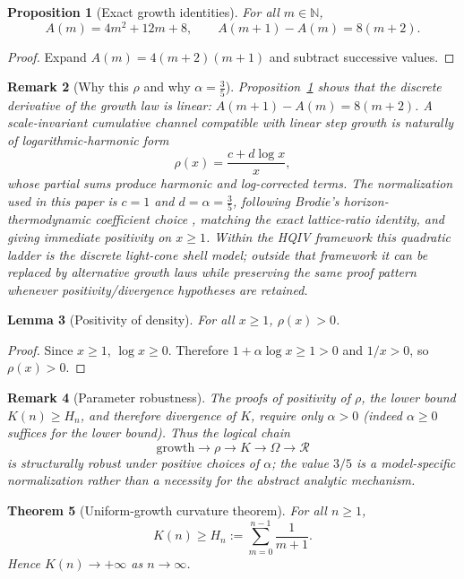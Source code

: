 \documentclass[11pt]{amsart}
\newtheorem{theorem}{Theorem}[section]
\newtheorem{lemma}[theorem]{Lemma}
\newtheorem{proposition}[theorem]{Proposition}
\newtheorem{remark}[theorem]{Remark}
\begin{document}
\begin{proposition}[Exact growth identities]
\label{prop:growth-identities}
For all $m\in\mathbb N$,
\[
A(m)=4m^2+12m+8,\qquad A(m+1)-A(m)=8(m+2).
\]
\end{proposition}

\begin{proof}
Expand $A(m)=4(m+2)(m+1)$ and subtract successive values.
\end{proof}

\begin{remark}[Why this $\rho$ and why $\alpha=\frac35$]
\label{rem:rho-motivation}
Proposition~\ref{prop:growth-identities} shows that the discrete derivative of the growth law is linear:
$A(m+1)-A(m)=8(m+2)$. A scale-invariant cumulative channel compatible with linear step growth is naturally of logarithmic-harmonic form
\[
\rho(x)=\frac{c+d\log x}{x},
\]
whose partial sums produce harmonic and log-corrected terms. The normalization used in this paper is $c=1$ and $d=\alpha=\frac35$, following Brodie's horizon-thermodynamic coefficient choice \cite{brodie2026}, matching the exact lattice-ratio identity, and giving immediate positivity on $x\ge 1$.
Within the HQIV framework this quadratic ladder is the discrete light-cone shell model; outside that framework it can be replaced by alternative growth laws while preserving the same proof pattern whenever positivity/divergence hypotheses are retained.
\end{remark}

\begin{lemma}[Positivity of density]
For all $x\ge 1$, $\rho(x)>0$.
\end{lemma}

\begin{proof}
Since $x\ge 1$, $\log x\ge 0$. Therefore $1+\alpha\log x\ge 1>0$ and $1/x>0$, so $\rho(x)>0$.
\end{proof}

\begin{remark}[Parameter robustness]
The proofs of positivity of \(\rho\), the lower bound \(K(n)\ge H_n\), and therefore divergence of \(K\), require only \(\alpha>0\) (indeed \(\alpha\ge 0\) suffices for the lower bound). Thus the logical chain
\[
\text{growth}\to \rho \to K \to \Omega \to \mathcal R
\]
is structurally robust under positive choices of \(\alpha\); the value \(3/5\) is a model-specific normalization rather than a necessity for the abstract analytic mechanism.
\end{remark}

\begin{theorem}[Uniform-growth curvature theorem]
\label{thm:main-curvature}
For all $n\ge 1$,
\[
K(n)\ge H_n:=\sum_{m=0}^{n-1}\frac1{m+1}.
\]
Hence $K(n)\to +\infty$ as $n\to\infty$.
\end{theorem}
\end{document}
